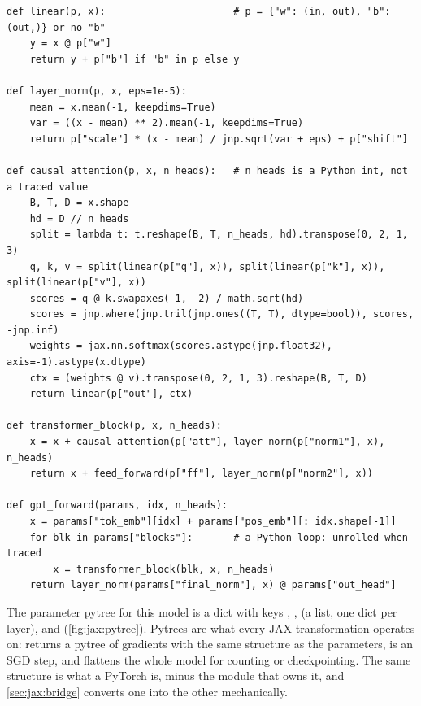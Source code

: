 \begin{lstlisting}[caption={A pre-LN transformer block as pure functions on a parameter pytree (\ident{llmsys/jaxlab/basics.py}). Linear weights are stored $(d_\text{in}, d_\text{out})$, the transpose of \code{nn.Linear.weight}.},label={lst:jax:block}]
def linear(p, x):                      # p = {"w": (in, out), "b": (out,)} or no "b"
    y = x @ p["w"]
    return y + p["b"] if "b" in p else y

def layer_norm(p, x, eps=1e-5):
    mean = x.mean(-1, keepdims=True)
    var = ((x - mean) ** 2).mean(-1, keepdims=True)
    return p["scale"] * (x - mean) / jnp.sqrt(var + eps) + p["shift"]

def causal_attention(p, x, n_heads):   # n_heads is a Python int, not a traced value
    B, T, D = x.shape
    hd = D // n_heads
    split = lambda t: t.reshape(B, T, n_heads, hd).transpose(0, 2, 1, 3)
    q, k, v = split(linear(p["q"], x)), split(linear(p["k"], x)), split(linear(p["v"], x))
    scores = q @ k.swapaxes(-1, -2) / math.sqrt(hd)
    scores = jnp.where(jnp.tril(jnp.ones((T, T), dtype=bool)), scores, -jnp.inf)
    weights = jax.nn.softmax(scores.astype(jnp.float32), axis=-1).astype(x.dtype)
    ctx = (weights @ v).transpose(0, 2, 1, 3).reshape(B, T, D)
    return linear(p["out"], ctx)

def transformer_block(p, x, n_heads):
    x = x + causal_attention(p["att"], layer_norm(p["norm1"], x), n_heads)
    return x + feed_forward(p["ff"], layer_norm(p["norm2"], x))

def gpt_forward(params, idx, n_heads):
    x = params["tok_emb"][idx] + params["pos_emb"][: idx.shape[-1]]
    for blk in params["blocks"]:       # a Python loop: unrolled when traced
        x = transformer_block(blk, x, n_heads)
    return layer_norm(params["final_norm"], x) @ params["out_head"]
\end{lstlisting}

The parameter pytree for this model is a dict with keys , ,
 (a list, one dict per layer),  and 
(\cref{fig:jax:pytree}). Pytrees are what every JAX transformation operates on:
 returns a pytree of gradients with the same structure as the parameters,
 is an SGD step, and
 flattens the whole model for counting or checkpointing. The
same structure is what a PyTorch  is, minus the module that owns it, and
\cref{sec:jax:bridge} converts one into the other mechanically.

